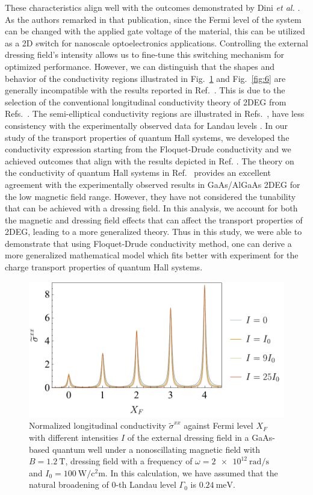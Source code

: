 These characteristics align well with the outcomes demonstrated by Dini \textit{et al.} \cite{dini16}.  As the authors remarked in that publication, since the Fermi level of the system can be changed with the applied gate voltage of the material, this can be utilized as a 2D switch for nanoscale optoelectronics applications. Controlling  the external dressing field's intensity allows us to fine-tune this switching mechanism for optimized performance.
However, we can distinguish that the shapes and behavior of the conductivity regions illustrated in Fig.~\ref{fig:5} and Fig.~\ref{fig:6} are generally incompatible with the results reported in Ref.~\cite{dini16}. This is due to the selection of the conventional longitudinal conductivity theory of 2DEG from Refs.~\cite{ando74_1,ando82}. The semi-elliptical conductivity regions are  illustrated in Refs.~\cite{dini16,ando74_1,ando82}, have less consistency with the experimentally observed data for Landau levels \cite{endo09}.
In our study of the transport properties of quantum Hall systems, we developed the conductivity expression starting from the Floquet-Drude conductivity \cite{wackerl20} and we achieved outcomes that align with the results depicted in Ref. \cite{endo09}.
The theory on the conductivity of quantum Hall systems in Ref.~\cite{endo09} provides an excellent agreement with the experimentally observed results in GaAs/AlGaAs 2DEG for the low magnetic field range.
However, they have not considered the tunability that can be achieved with a dressing field. In this analysis, we account for both the magnetic and dressing field effects that can affect the transport properties of 2DEG, leading to a more generalized theory. Thus in this study, we were able to demonstrate that using Floquet-Drude conductivity method, one can derive a more generalized mathematical model which fits better with experiment for the charge transport properties of quantum Hall systems.

\begin{figure}[t]
\includegraphics[scale=0.55]{figures/fig_4}
\caption{ Normalized longitudinal conductivity $\widetilde{\sigma}^{xx}$ against Fermi level $X_F$ with different intensities $I$ of the external dressing field in a GaAs-based quantum well under a nonoscillating magnetic field with $B = \SI{1.2}{\tesla}$, dressing field with a  frequency of $\omega =\SI{2e12}{\radian\per\second}$ and $I_0 =\SI{100}{\watt\per\square\centi\metre}$. In this calculation, we have assumed that the natural  broadening of $0$-th Landau level $\Gamma_0$ is $\SI{0.24}{\milli\eV}$.}
\label{fig:5}
\end{figure}


